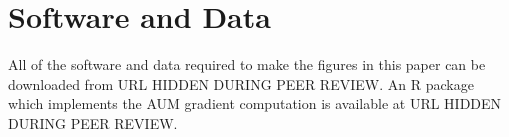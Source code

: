 \documentclass{article}
\begin{document}
\section*{Software and Data}

All of the software and data required to make the figures in this paper can be downloaded from URL HIDDEN DURING PEER REVIEW. An R package which implements the AUM gradient computation is available at URL HIDDEN DURING PEER REVIEW.







\end{document}

